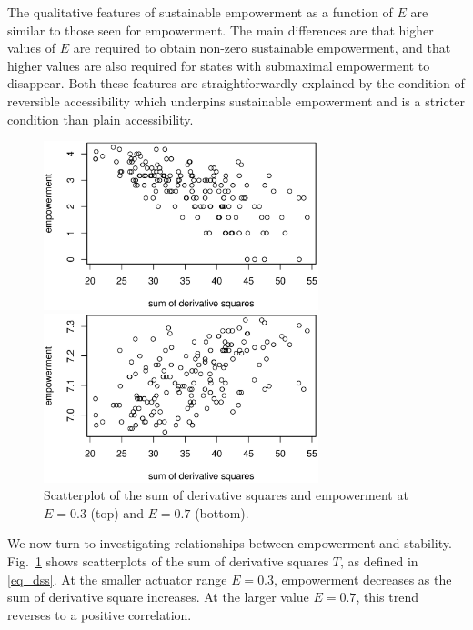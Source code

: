 \documentclass[conference]{IEEEtran}
\newcommand{\sumderivsquares}{\ensuremath{T}}
\newcommand{\impactstrength}{\ensuremath{E}}
\begin{document}
The qualitative features of sustainable empowerment as a function of
$\impactstrength$ are similar to those seen for empowerment. The main differences
are that higher values of $\impactstrength$ are required to obtain non-zero
sustainable empowerment, and that higher values are also required for
states with submaximal empowerment to disappear. Both these features
are straightforwardly explained by the condition of reversible
accessibility which underpins sustainable empowerment and is a
stricter condition than plain accessibility.


\begin{figure}

  \begin{center}

    \includegraphics[width=8cm]{n08_full_small_corr_dss_emp_ai030.eps}

    \includegraphics[width=8cm]{n08_full_small_corr_dss_emp_ai070.eps}

  \end{center}

  \caption{Scatterplot of the sum of derivative squares and
    empowerment at $\impactstrength = 0.3$ (top) and $\impactstrength = 0.7$ (bottom).}
  \label{fig_dssemp}

\end{figure}

We now turn to investigating relationships between empowerment and
stability. Fig.~\ref{fig_dssemp} shows scatterplots of the sum of
derivative squares $\sumderivsquares$, as defined in \eqref{eq_dss}.
At the smaller actuator range $\impactstrength = 0.3$, empowerment decreases as the
sum of derivative square increases. At the larger value $\impactstrength = 0.7$,
this trend reverses to a positive correlation.
\end{document}
